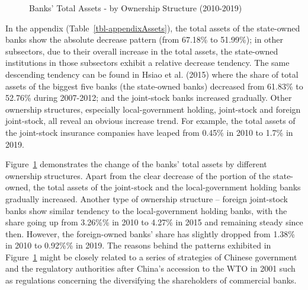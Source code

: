 \documentclass[
  letterpaper,
  DIV=11,
  numbers=noendperiod]{scrreprt}
\begin{document}
\begin{figure}


\caption{\label{fig-AssetsOwnership}Banks' Total Assets - by Ownership
Structure (2010-2019)}

\end{figure}%

In the appendix (Table~\ref{tbl-appendixAssets}), the total assets of
the state-owned banks show the absolute decrease pattern (from 67.18\%
to 51.99\%); in other subsectors, due to their overall increase in the
total assets, the state-owned institutions in those subsectors exhibit a
relative decrease tendency. The same descending tendency can be found in
Hsiao et al. (2015) where the share of total assets of the biggest five
banks (the state-owned banks) decreased from 61.83\% to 52.76\% during
2007-2012; and the joint-stock banks increased gradually. Other
ownership structures, especially local-government holding, joint-stock
and foreign joint-stock, all reveal an obvious increase trend. For
example, the total assets of the joint-stock insurance companies have
leaped from 0.45\% in 2010 to 1.7\% in 2019.

Figure~\ref{fig-AssetsOwnership} demonstrates the change of the banks'
total assets by different ownership structures. Apart from the clear
decrease of the portion of the state-owned, the total assets of the
joint-stock and the local-government holding banks gradually increased.
Another type of ownership structure -- foreign joint-stock banks show
similar tendency to the local-government holding banks, with the share
going up from 3.26\%\% in 2010 to 4.27\% in 2015 and remaining steady
since then. However, the foreign-owned banks' share has slightly dropped
from 1.38\% in 2010 to 0.92\%\% in 2019. The reasons behind the patterns
exhibited in Figure~\ref{fig-AssetsOwnership} might be closely related
to a series of strategies of Chinese government and the regulatory
authorities after China's accession to the WTO in 2001 such as
regulations concerning the diversifying the shareholders of commercial
banks.
\end{document}
